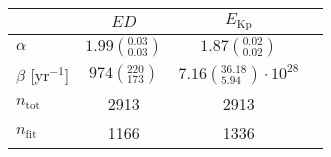 \begin{tabular}{lccr}
\hline
  &                               $ED$ &                                  $E_\mathrm{Kp}$ \\
\hline
$\alpha$            &  $1.99\left(^{0.03}_{0.03}\right)$ &                $1.87\left(^{0.02}_{0.02}\right)$ \\
$\beta$ [yr$^{-1}$] &     $974\left(^{220}_{173}\right)$ &  $7.16\left(^{36.18}_{5.94}\right)\cdot 10^{28}$ \\
$n_\mathrm{tot}$    &                               2913 &                                             2913 \\
$n_\mathrm{fit}$    &                               1166 &                                             1336 \\
\hline

\end{tabular}
